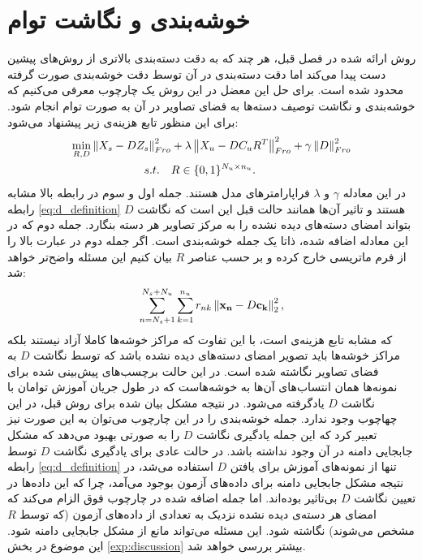 \section{خوشه‌بندی و نگاشت توام} \label{jeac}
روش ارائه شده در فصل قبل، هر چند که به دقت دسته‌بندی بالاتری از روش‌های پیشین دست پیدا می‌کند اما دقت دسته‌بندی در آن توسط دقت خوشه‌بندی صورت گرفته محدود شده است. برای حل این معضل در این روش یک چارچوب معرفی می‌کنیم که خوشه‌بندی و نگاشت توصیف دسته‌ها به فضای تصاویر در آن به صورت توام انجام شود.
برای این منظور تابع هزینه‌ی زیر پیشنهاد می‌شود:
\begin{align}
\label{eq:joint}
 \min_{R,D} \left \lVert X_s - D Z_s \right \rVert_{Fro}^2  &+ \lambda \left \lVert X_u - D C_u R^T  \right \rVert_{Fro}^2 + \gamma \left \lVert D \right \rVert_{Fro}^2 \\
   s.t. \quad & R \in \{0,1\}^{N_u \times n_u}. \nonumber
\end{align}
در این معادله $\gamma$ و $\lambda$ فراپارامترهای مدل هستند. جمله اول و سوم در رابطه بالا مشابه رابطه \eqref{eq:d_definition} هستند و تاثیر آن‌ها همانند حالت قبل این است که نگاشت $D$ بتواند امضای دسته‌های دیده نشده را به مرکز تصاویر هر دسته بنگارد. جمله دوم که در این معادله اضافه شده، ذاتا یک جمله خوشه‌بندی است. اگر جمله دوم در عبارت بالا را از فرم ماتریسی خارج کرده و بر حسب عناصر $R$ بیان کنیم این مسئله واضح‌تر  خواهد شد:
\begin{equation}
\label{eq:essentialy_clustering}
\sum_{n=N_s+1}^{N_s + N_u} \sum_{k=1}^{n_u} r_{nk} \left \lVert \mathbf{x_n} - D \mathbf{c_k} \right \rVert_2^2,
\end{equation}
که مشابه تابع هزینه‌ی
است، با این تفاوت که مراکز خوشه‌ها کاملا آزاد نیستند بلکه مراکز خوشه‌ها باید تصویر امضای دسته‌های دیده نشده باشد که توسط نگاشت $D$ به فضای تصاویر نگاشته شده است. در این حالت برچسب‌های پیش‌بینی شده برای نمونه‌ها همان انتساب‌های آن‌ها به خوشه‌هاست که در طول جریان آموزش توامان با نگاشت $D$ یادگرفته می‌شود. در نتیجه مشکل بیان شده برای روش قبل، در این چهاچوب وجود ندارد. جمله خوشه‌بندی را در این چارچوب می‌توان به این صورت نیز تعبیر کرد که این جمله یادگیری نگاشت $D$ را به صورتی بهبود می‌دهد که مشکل جابجایی دامنه در آن وجود نداشته باشد. در حالت عادی برای یادگیری نگاشت $D$ توسط رابطه
\eqref{eq:d_definition}
تنها از نمونه‌های آموزش برای یافتن $D$ استفاده می‌شد، در نتیجه مشکل جابجایی دامنه برای داده‌های آزمون بوجود می‌آمد، چرا که این داده‌ها در تعیین نگاشت $D$ بی‌تاثیر بوده‌اند. اما جمله اضافه شده در چارچوب فوق الزام می‌کند که امضای هر دسته‌ی دیده نشده نزدیک به تعدادی از داده‌های آزمون (که توسط $R$ مشخص می‌شوند) نگاشته شود. این مسئله می‌تواند مانع از مشکل جابجایی دامنه شود. این موضوع در بخش
\ref{exp:discussion}
بیشتر بررسی خواهد شد.
